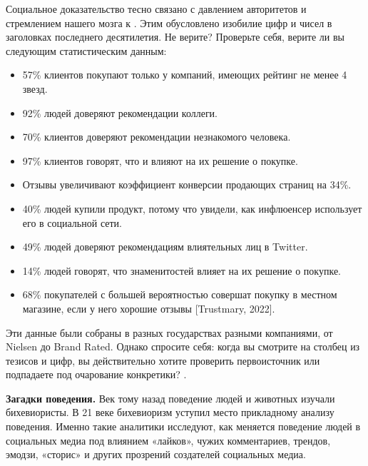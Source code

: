 Социальное доказательство тесно связано с давлением авторитетов и стремлением нашего мозга к . Этим обусловлено изобилие цифр и чисел в заголовках последнего десятилетия. Не верите? Проверьте себя, верите ли вы следующим статистическим данным:
\begin{itemize}[noitemsep, label=--]
    \item 57\% клиентов покупают только у компаний, имеющих рейтинг не менее 4 звезд.
    \item 92\% людей доверяют рекомендации коллеги.
    \item 70\% клиентов доверяют рекомендации незнакомого человека.
    \item 97\% клиентов говорят, что  и  влияют на их решение о покупке.
    \item Отзывы увеличивают коэффициент конверсии продающих страниц на 34\%.
    \item 40\% людей купили продукт, потому что увидели, как инфлюенсер использует его в социальной сети.
    \item 49\% людей доверяют рекомендациям влиятельных лиц в Twitter.
    \item 14\% людей говорят, что  знаменитостей влияет на их решение о покупке.
    \item 68\% покупателей с большей вероятностью совершат покупку в местном магазине, если у него хорошие отзывы [Trustmary, 2022].
\end{itemize}
Эти данные были собраны в разных государствах разными компаниями, от Nielsen до Brand Rated. Однако спросите себя: когда вы смотрите на столбец из тезисов и цифр, вы действительно хотите проверить первоисточник или подпадаете под очарование конкретики? .

\textbf{Загадки поведения.}
Век тому назад поведение людей и животных изучали бихевиористы. В 21 веке бихевиоризм уступил место прикладному анализу поведения. Именно такие аналитики исследуют, как меняется поведение людей в социальных медиа под влиянием «лайков», чужих комментариев, трендов, эмодзи, «сторис» и других прозрений создателей социальных медиа.


